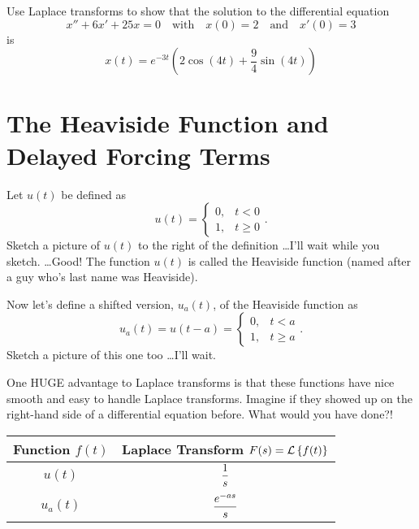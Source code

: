 \begin{problem}
    Use Laplace transforms to show that the solution to the differential equation
    \[ x'' + 6x' + 25x = 0 \quad \text{with} \quad x(0) = 2 \quad \text{and} \quad x'(0) =
    3 \]
    is
    \[ x(t) = e^{-3t} \left( 2 \cos(4t) + \frac{9}{4} \sin(4t) \right) \]
\end{problem}



\newpage\section{The Heaviside Function and Delayed Forcing Terms}
\begin{problem}
    Let $u(t)$ be defined as
    \[ u(t) = \left\{ \begin{array}{ll} 0, & t<0 \\ 1, & t\ge 0 \end{array} \right. . \]
    Sketch a picture of $u(t)$ to the right of the definition \dots I'll wait while you
    sketch. \dots Good!  The function $u(t)$ is called the Heaviside function (named after a
    guy who's last name was Heaviside).  
\end{problem}



\begin{problem}
    Now let's define a shifted version, $u_a(t)$, of the Heaviside function as 
    \[ u_a(t) = u(t-a) = \left\{ \begin{array}{ll} 0, & t<a \\ 1, & t\ge a \end{array}
    \right. . \]
    Sketch a picture of this one too \dots I'll wait.
\end{problem}

One HUGE advantage to Laplace transforms is that these functions have nice smooth and easy
to handle Laplace transforms.  Imagine if they showed up on the right-hand side of a
differential equation before.  What would you have done?!
\begin{center}
    \setlength\extrarowheight{10pt}
    \begin{tabular}{|c|c|}
        \hline
        Function $f(t)$ & Laplace Transform $F(s) = \mathcal{L}\left\{ f(t) \right\}$ \\ \hline \hline
        $u(t)$ & $\displaystyle \frac{1}{s}$ \\
        $u_a(t)$ & $\displaystyle \frac{e^{-as}}{s}$ \\\hline
    \end{tabular}
\end{center}


